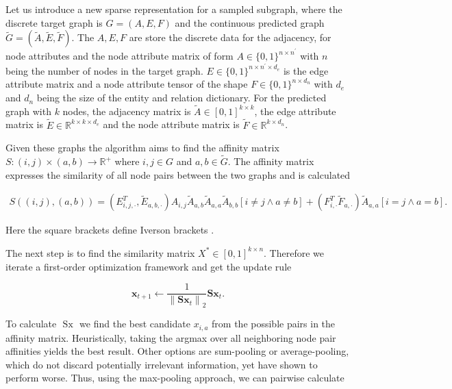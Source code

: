{{%
Let us introduce a new sparse representation for a sampled subgraph, where the discrete target graph is $G=(A, E, F)$ and the continuous predicted graph $\widetilde{G}=(\widetilde{A}, \widetilde{E}, \widetilde{F})$. The $A, E, F$ are store the discrete data for the adjacency, for node attributes and the node attribute matrix of form $A \in\{0,1\}^{n \times n^{\prime}}$ with $n$ being the number of nodes in the target graph. $E\in\{0,1\}^{n \times n^{\prime} \times d_e}$ is the edge attribute matrix and a node attribute tensor of the shape $F\in\{0,1\}^{n \times d_n}$ with $d_e$ and $d_n$ being the size of the entity and relation dictionary. For the predicted graph with $k$ nodes, the adjacency matrix is $\widetilde{A} \in[0,1]^{k \times k}$, the edge attribute matrix is $\widetilde{E} \in \mathbb{R}^{k \times k \times d_{e}}$ and the node attribute matrix is $\widetilde{F} \in \mathbb{R}^{k \times d_{n}}$.


Given these graphs the algorithm aims to find the affinity matrix $S:(i, j) \times(a, b) \rightarrow \mathbb{R}^{+}$ where $i, j \in G$ and $a, b \in \widetilde{G}$. The affinity matrix expresses the similarity of all node pairs between the two graphs and is calculated 

\begin{equation}
    \begin{array}{l}
        S((i, j),(a, b)) = \left(E_{i, j, \cdot}^{T}, \widetilde{E}_{a, b, \cdot}\right) A_{i, j} \widetilde{A}_{a, b} \widetilde{A}_{a, a} \widetilde{A}_{b, b}[i \neq j \wedge a \neq b] + \left(F_{i, \cdot}^{T} \widetilde{F}_{a, \cdot}\right) \widetilde{A}_{a, a}[i=j \wedge a=b].
    \end{array}
\label{eq3:s}
\end{equation}

Here the square brackets define Iverson brackets \cite{simonovsky_graphvae_2018}.


The next step is to find the similarity matrix $X^* \in[0,1]^{k \times n}$. Therefore we iterate a first-order optimization framework and get the update rule

\begin{equation}
    \mathbf{x}_{t+1} \leftarrow \frac{1}{\left\|\mathbf{S} \mathbf{x}_{t}\right\|_{2}} \mathbf{S} \mathbf{x}_{t}.
\end{equation}

To calculate $\text { Sx }$ we find the best candidate $x_{i,a}$ from the possible pairs in the affinity matrix. Heuristically, taking the argmax over all neighboring node pair affinities yields the best result. Other options are sum-pooling or average-pooling, which do not discard potentially irrelevant information, yet have shown to perform worse. Thus, using the max-pooling approach, we can pairwise calculate

}}
